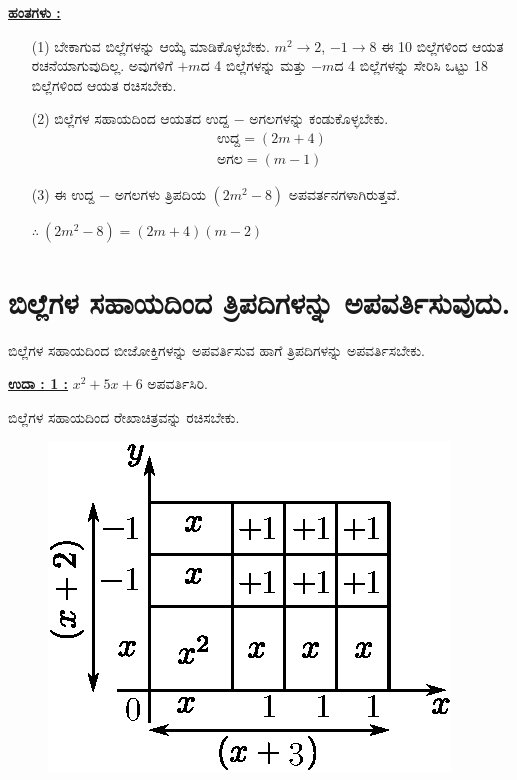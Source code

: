 \noindent
{\textbf{\underline{ಹಂತಗಳು :}}}
\begin{itemize}
\item [(1)] ಬೇಕಾಗುವ ಬಿಲ್ಲೆಗಳನ್ನು ಆಯ್ಕೆ ಮಾಡಿಕೊಳ್ಳಬೇಕು. $m^2 \rightarrow 2$, $-1 \rightarrow 8$  ಈ 10 ಬಿಲ್ಲೆಗಳಿಂದ ಆಯತ ರಚನೆಯಾಗುವುದಿಲ್ಲ. ಅವುಗಳಿಗೆ $+m$ದ 4 ಬಿಲ್ಲೆಗಳನ್ನು ಮತ್ತು $-m$ದ 4 ಬಿಲ್ಲೆಗಳನ್ನು ಸೇರಿಸಿ ಒಟ್ಟು 18 ಬಿಲ್ಲೆಗಳಿಂದ ಆಯತ ರಚಿಸಬೇಕು. 
\item [(2)] ಬಿಲ್ಲೆಗಳ ಸಹಾಯದಿಂದ ಆಯತದ ಉದ್ದ $-$ ಅಗಲಗಳನ್ನು ಕಂಡುಕೊಳ್ಳಬೇಕು.
\begin{gather*}
\text{ಉದ್ದ} = (2m+4)\\
\text{ಅಗಲ} = (m-1)
\end{gather*}

\item [(3)] ಈ ಉದ್ದ $-$ ಅಗಲಗಳು ತ್ರಿಪದಿಯ $(2m^{2}-8)$ ಅಪವರ್ತನಗಳಾಗಿರುತ್ತವೆ. 

$\therefore~ (2m^2 - 8) = (2m + 4)(m-2)$
\end{itemize}

\section*{ಬಿಲ್ಲೆಗಳ ಸಹಾಯದಿಂದ ತ್ರಿಪದಿಗಳನ್ನು ಅಪವರ್ತಿಸುವುದು.}

ಬಿಲ್ಲೆಗಳ ಸಹಾಯದಿಂದ ಬೀಜೋಕ್ತಿಗಳನ್ನು ಅಪವರ್ತಿಸುವ ಹಾಗೆ ತ್ರಿಪದಿಗಳನ್ನು ಅಪವರ್ತಿಸಬೇಕು. 

\noindent
{\textbf{\underline{ಉದಾ : 1 :}}} $x^2 + 5x + 6				$ ಅಪವರ್ತಿಸಿರಿ. 

ಬಿಲ್ಲೆಗಳ ಸಹಾಯದಿಂದ ರೇಖಾಚಿತ್ರವನ್ನು ರಚಿಸಬೇಕು.
\begin{figure}[H]
\centering
\includegraphics[scale=0.8]{src/figure/chap3/fig3-39b.eps}
\end{figure}

